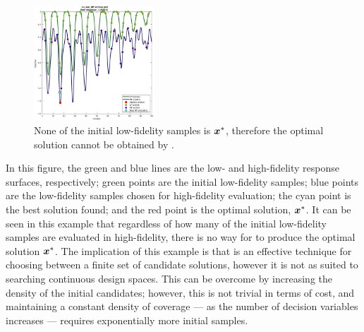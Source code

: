 \begin{figure}[h!]
  \centering
  \includegraphics[width = 0.40\textwidth]{img/ex_motos.eps} 
  \caption{None of the initial low-fidelity samples is $\boldsymbol{x}^*$, therefore the optimal solution cannot be obtained by \motos{}.} 
    \label{fig:motos-example}
\end{figure}
In this figure, the green and blue lines are the low- and high-fidelity response surfaces, respectively; green points are the initial low-fidelity samples; blue points are the low-fidelity samples chosen for high-fidelity evaluation; the cyan point is the best solution found; and the red point is the optimal solution, $\boldsymbol{x}^*$. It can be seen in this example that regardless of how many of the initial low-fidelity samples are evaluated in high-fidelity, there is no way for \motos{} to produce the optimal solution $\boldsymbol{x}^*$. The implication of this example is that \motos{} is an effective technique for choosing between a finite set of candidate solutions, however it is not as suited to searching continuous design spaces. This can be overcome by increasing the density of the initial candidates; however, this is not trivial in terms of cost, and maintaining a constant density of coverage --- as the number of decision variables increases --- requires exponentially more initial samples.
